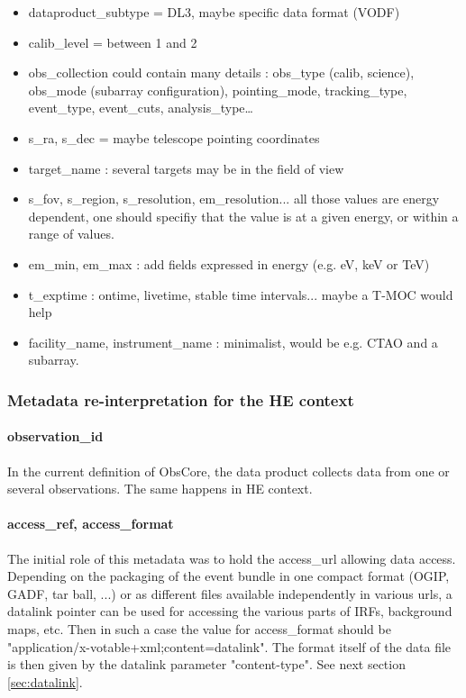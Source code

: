 \documentclass[11pt,a4paper]{ivoa}
\begin{document}
{\begin{itemize}
    \item dataproduct\_subtype = DL3, maybe specific data format (\gls{VODF})
    \item calib\_level = between 1 and 2
    \item obs\_collection could contain many details : obs\_type (calib, science), obs\_mode (subarray
configuration), pointing\_mode, tracking\_type, event\_type, event\_cuts, analysis\_type…
    \item s\_ra, s\_dec = maybe telescope pointing coordinates
    \item target\_name : several targets may be in the field of view
    \item s\_fov, s\_region, s\_resolution, em\_resolution... all those values are energy dependent, one should specifiy that the value is at a given energy, or within a range of values.
    \item em\_min, em\_max : add fields expressed in energy (e.g. eV, keV or TeV)
    \item t\_exptime : ontime, livetime, stable time intervals... maybe a T-MOC would help
    \item facility\_name, instrument\_name : minimalist, would be e.g. \gls{CTAO} and a subarray.
\end{itemize}


\subsubsection{Metadata re-interpretation for the HE context}

\paragraph{observation\_id}
In the current definition of ObsCore, the data product collects data from one or several observations. The same happens in \gls{HE} context.

\paragraph{access\_ref, access\_format}
The initial role of this metadata was to hold the access\_url allowing data access.
Depending on the packaging of the event bundle in one compact format (\gls{OGIP}, \gls{GADF}, tar ball, ...)
or as different files available independently in various urls, a datalink pointer can be used for accessing the various parts of \gls{IRF}s, background maps, etc.
Then in such a case the value for access\_format should be "application/x-votable+xml;content=datalink". The format itself of the data file is then given by the datalink parameter "content-type".
See next section \ref{sec:datalink}.

}
\end{document}
